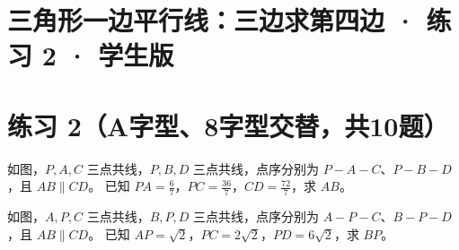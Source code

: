 \documentclass{exam-zh}
\begin{document}
\section*{三角形一边平行线：三边求第四边 · 练习 2 · 学生版}

\section*{练习 2（A字型、8字型交替，共10题）}


\begin{problem}[points=10]
  \noindent
  \begin{minipage}[t]{\dimexpr\linewidth-60mm-6mm\relax}
    \vspace{0pt}
    如图，$P,A,C$ 三点共线，$P,B,D$ 三点共线，点序分别为 $P-A-C$、$P-B-D$，且 $AB\parallel CD$。
已知 $PA=\frac{6}{7}$，$PC=\frac{36}{7}$，$CD=\frac{72}{7}$，求 $AB$。
    
  \end{minipage}\hfill
  \begin{diagramcoltikz}{60mm}{先看平行边方向，再判断 A 字型或 8 字型及对应边。}
  }
  \end{diagramcoltikz}
  \par\medskip
  \answerarea[42mm]
\end{problem}



\begin{problem}[points=10]
  \noindent
  \begin{minipage}[t]{\dimexpr\linewidth-60mm-6mm\relax}
    \vspace{0pt}
    如图，$A,P,C$ 三点共线，$B,P,D$ 三点共线，点序分别为 $A-P-C$、$B-P-D$，且 $AB\parallel CD$。
已知 $AP=\sqrt{2}$，$PC=2\sqrt{2}$，$PD=6\sqrt{2}$，求 $BP$。
    
  \end{minipage}\hfill
  \begin{diagramcoltikz}{60mm}{先看平行边方向，再判断 A 字型或 8 字型及对应边。}
  }
  \end{diagramcoltikz}
  \par\medskip
  \answerarea[42mm]
\end{problem}
\end{document}
